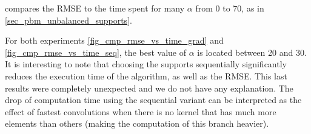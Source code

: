\noindent
{} compares the RMSE to the time spent for many $\alpha$ from 0 to 70, as in \cref{sec_pbm_unbalanced_supports}. 

\noindent
For both experiments \cref{fig_cmp_rmse_vs_time_grad} and \cref{fig_cmp_rmse_vs_time_seq}, the best value of $\alpha$ is located between 20 and 30. It is interesting to note that choosing the supports sequentially significantly reduces the execution time of the algorithm, as well as the RMSE. This last results were completely unexpected and we do not have any explanation. The drop of computation time using the sequential variant can be interpreted as the effect of fastest convolutions when there is no kernel that has much more elements than others (making the computation of this branch heavier).

